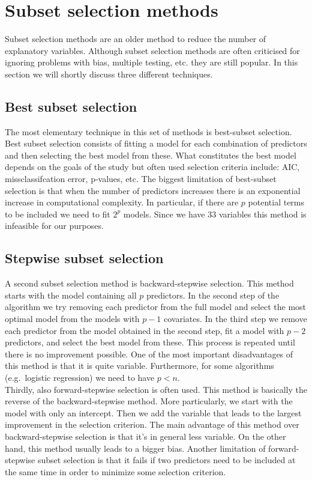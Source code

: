 \section{Subset selection methods}
\label{sec:SubsetSelectionMethods}
Subset selection methods are an older method to reduce the number of explanatory variables. Although subset selection methods are often criticised for ignoring problems with bias, multiple testing, etc. \parencite{whittingham_why_2006} they are still popular. In this section we will shortly discuss three different techniques. \\

\subsection{Best subset selection}
The most elementary technique in this set of methods is best-subset selection. Best subset selection consists of fitting a model for each combination of predictors and then selecting the best model from these. What constitutes the best model depends on the goals of the study but often used selection criteria include: AIC, missclassifcation error, p-values, etc. The biggest limitation of best-subset selection is that when the number of predictors increases there is an exponential increase in computational complexity. In particular, if there are $p$ potential terms to be included we need to fit $2^p$ models. Since we have $33$ variables this method is infeasible for our purposes.\\

\subsection{Stepwise subset selection}
A second subset selection method is backward-stepwise selection. This method starts with the model containing all $p$ predictors. In the second step of the algorithm we try removing each predictor from the full model and select the most optimal model from the models with $p-1$ covariates. In the third step we remove each predictor from the model obtained in the second step, fit a model with $p-2$ predictors, and select the best model from these. This process is repeated until there is no improvement possible. One of the most important disadvantages of this method is that it is quite variable. Furthermore, for some algorithms (e.g.\ logistic regression) we need to have $p < n$.
\\

Thirdly, also forward-stepwise selection is often used. This method is basically the reverse of the backward-stepwise method. More particularly, we start with the model with only an intercept. Then we add the variable that leads to the largest improvement in the selection criterion. The main advantage of this method over backward-stepwise selection is that it's in general less variable. On the other hand, this method usually leads to a bigger bias. Another limitation of forward-stepwise subset selection is that it fails if two predictors need to be included at the same time in order to minimize some selection criterion.\\

